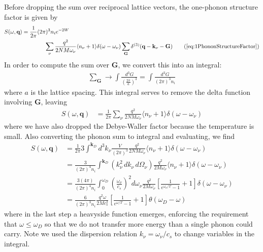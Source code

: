\documentclass{article}
\begin{document}
Before dropping the sum over reciprocal lattice vectors, the one-phonon structure factor is given by
\begin{align}
S(\omega, \textbf{q}) &= \frac{1}{2 \pi} (2 \pi)^3 n_i e^{-2 W}  \nonumber\\
&\qquad\qquad  \sum_\nu\frac{q^2}{2 NM \omega_\nu} \langle n_\nu + 1 \rangle \delta(\omega - \omega_\nu) \sum_\textbf{G} \delta^{(3)}(\textbf{q} - \textbf{k}_\nu - \textbf{G})
\tag{\ref{eq:1PhononStructureFactor}}
\end{align}
In order to compute the sum over $\textbf{G}$, we convert this into an integral:
\begin{align}
\sum_\textbf{G} \to \int \frac{d^3 G}{\left( \frac{2 \pi}{a} \right)^3} = \int \frac{d^3 G}{(2 \pi)^3 n_i}
\end{align}
where $a$ is the lattice spacing. This integral serves to remove the delta function involving $\textbf{G}$, leaving
\begin{align}
S(\omega, \textbf{q}) &= \frac{1}{2 \pi}  \sum_\nu\frac{q^2}{2 NM \omega_\nu} \langle n_\nu + 1 \rangle \delta(\omega - \omega_\nu)
\end{align}
where we have also dropped the Debye-Waller factor because the temperature is small. Also converting the phonon sum to integral and evaluating, we find
\begin{align}
   S(\omega, \textbf{q}) &= \frac{1}{2 \pi}  3 \int^{\textbf{k}_D} d^3 k_\nu \frac{V}{(2 \pi)^3} \frac{q^2}{2 NM \omega_\nu} \langle n_\nu + 1 \rangle \delta(\omega - \omega_\nu) \nonumber\\
   &= \frac{3}{(2 \pi)^4 n_i}  \int^{\textbf{k}_D} (k_\nu^2\, dk_\nu \, d \Omega_\nu) \frac{q^2}{2 M \omega_\nu} \langle n_\nu + 1 \rangle \delta(\omega - \omega_\nu) \nonumber\\
   &= \frac{3(4 \pi)}{(2 \pi)^4 n_i}  \int_0^{\omega_D} \left( \frac{\omega_\nu}{c_s} \right)^2 d \omega_\nu \frac{q^2}{2 M \omega_\nu} \left[ \frac{1}{e^{\omega_\nu/T} - 1} + 1 \right] \delta(\omega - \omega_\nu) \nonumber\\
   &= \frac{6}{(2 \pi)^3 n_i} \frac{q^2\omega}{2 M c_s^2} \left[ \frac{1}{e^{\omega/T} - 1} + 1 \right] \theta(\omega_D - \omega)
\end{align}
where in the last step a heavyside function emerges, enforcing the requirement that $\omega \leq \omega_D$ so that we do not transfer more energy than a single phonon could carry. Note we used the dispersion relation $k_\nu = \omega_\nu / c_s$ to change variables in the integral.
\end{document}
